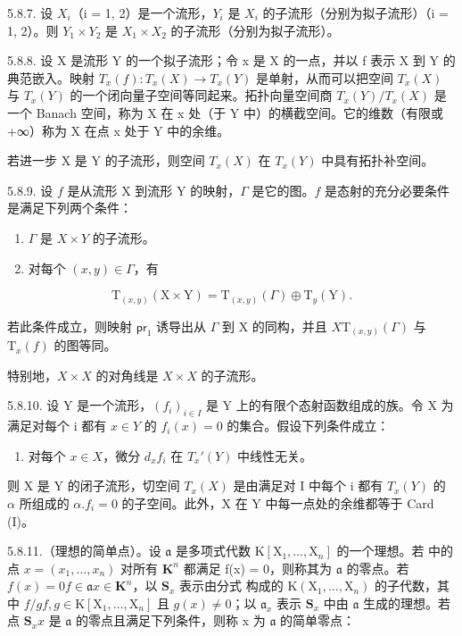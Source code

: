 5.8.7. 设 \(X_{i}\)（i = 1, 2）是一个流形，\(Y_{i}\) 是 \(X_{i}\) 的子流形（分别为拟子流形）（i = 1, 2）。则 \(Y_{1} \times Y_{2}\) 是 \(X_{1} \times X_{2}\) 的子流形（分别为拟子流形）。

5.8.8. 设 X 是流形 Y 的一个拟子流形；令 x 是 X 的一点，并以 f 表示 X 到 Y 的典范嵌入。映射 \(T_{x}(f):T_{x}(X)\to T_{x}(Y)\) 是单射，从而可以把空间 \(T_{x}(X)\) 与 \(T_{x}(Y)\) 的一个闭向量子空间等同起来。拓扑向量空间商 \(T_{x}(Y)/T_{x}(X)\) 是一个 Banach 空间，称为 X 在 x 处（于 Y 中）的横截空间。它的维数（有限或 +∞）称为 X 在点 x 处于 Y 中的余维。

若进一步 X 是 Y 的子流形，则空间 \(T_{x}(X)\) 在 \(T_{x}(Y)\) 中具有拓扑补空间。

5.8.9. 设 \(f\) 是从流形 X 到流形 Y 的映射，\(\Gamma\) 是它的图。\(f\) 是态射的充分必要条件是满足下列两个条件：

\begin{enumerate}
\def\labelenumi{(\roman{enumi})}
\item
  \(\Gamma\) 是 \(X \times Y\) 的子流形。
\item
  对每个 \((x, y) \in \Gamma\)，有
\end{enumerate}

\[
\mathrm{T} _ {(x, y)} (\mathrm{X} \times \mathrm{Y}) = \mathrm{T} _ {(x, y)} (\Gamma) \oplus \mathrm{T} _ {y} (\mathrm{Y}).
\]

若此条件成立，则映射 \(\mathsf{pr}_1\) 诱导出从 \(\Gamma\) 到 X 的同构，并且 \(X\)\(\mathrm{T}_{(x,y)}(\Gamma)\) 与 \(\mathrm{T}_x(f)\) 的图等同。

特别地，\(X \times X\) 的对角线是 \(X \times X\) 的子流形。

5.8.10. 设 Y 是一个流形，\((f_{i})_{i\in I}\) 是 Y 上的有限个态射函数组成的族。令 X 为满足对每个 i 都有 \(x\in Y\) 的 \(f_{i}(x)=0\) 的集合。假设下列条件成立：

\begin{enumerate}
\def\labelenumi{(\Alph{enumi})}
\setcounter{enumi}{9}
\tightlist
\item
  对每个 \(x \in X\)，微分 \(d_x f_i\) 在 \(T_x'(Y)\) 中线性无关。
\end{enumerate}

则 X 是 Y 的闭子流形，切空间 \(T_{x}(X)\) 是由满足对 I 中每个 i 都有 \(T_{x}(Y)\) 的 \(\alpha\) 所组成的 \(\alpha.f_{i}=0\) 的子空间。此外，X 在 Y 中每一点处的余维都等于 Card (I)。

5.8.11.（理想的简单点）。设 \(\mathfrak{a}\) 是多项式代数 \(\mathrm{K}[\mathrm{X}_1,\ldots ,\mathrm{X}_n]\) 的一个理想。若  中的点 \(x = (x_{1},\dots,x_{n})\) 对所有 \(\mathbf{K}^n\) 都满足 f(x) = 0，则称其为 \(\mathfrak{a}\) 的零点。若 \(f(x) = 0\)\(f\in \mathfrak{a}\)\(x\in \mathbf{K}^n\)，以 \(\mathbf{S}_x\) 表示由分式  构成的 \(\mathrm{K}(\mathrm{X}_1,\dots,\mathrm{X}_n)\) 的子代数，其中 \(f / g\)\(f,g\in \mathrm{K}[\mathrm{X}_1,\dots,\mathrm{X}_n]\) 且 \(g(x)\neq 0\)；以 \(\mathfrak{a}_x\) 表示 \(\mathbf{S}_x\) 中由 \(\mathfrak{a}\) 生成的理想。若点 \(\mathbf{S}_x\)\(x\) 是 \(\mathfrak{a}\) 的零点且满足下列条件，则称 x 为 \(\mathfrak{a}\) 的简单零点：

